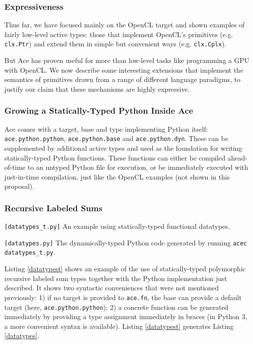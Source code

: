\subsubsection{Expressiveness}\label{examples}
Thus far, we have focused mainly on the OpenCL target and shown examples of fairly low-level active types: those that implement OpenCL's primitives (e.g. \verb|clx.Ptr|) and extend them in simple but convenient ways (e.g. \verb|clx.Cplx|).

But Ace has proven useful for more than low-level tasks like programming a GPU with OpenCL. We now describe some interesting extensions that implement the semantics of primitives drawn from a range of different language paradigms, to justify our claim that these mechanisms are highly expressive. 

\subsubsection{Growing a Statically-Typed Python Inside Ace}
Ace comes with a target, base and type implementing Python itself: \verb|ace.python.python|, \verb|ace.python.base| and \verb|ace.python.dyn|. These can be supplemented by additional active types and used as the foundation for writing statically-typed Python functions. These functions can either be compiled ahead-of-time to an untyped Python file for execution, or be immediately executed with just-in-time compilation, just like the OpenCL examples (not shown in this proposal).%

\subsubsection{Recursive Labeled Sums}
\begin{codelisting}

\caption{\texttt{[datatypes\_t.py]} An example using statically-typed functional datatypes.}
\label{datatypest}
\end{codelisting}
\begin{codelisting}

\caption{\texttt{[datatypes.py]} The dynamically-typed Python code generated by running \texttt{acec datatypes\_t.py}.}
\label{datatypes}
\end{codelisting}
Listing \ref{datatypest} shows an example of the use of statically-typed polymorphic recursive labeled sum types together with the Python implementation just described. It shows two syntactic conveniences that were not mentioned previously: 1) if no target is provided to \verb|ace.fn|, the base can provide a default target (here, \verb|ace.python.python|); 2) a concrete function can be generated immediately by providing a type assignment immediately in braces (in Python 3, a more convenient syntax is available). Listing \ref{datatypest} generates Listing \ref{datatypes}.

